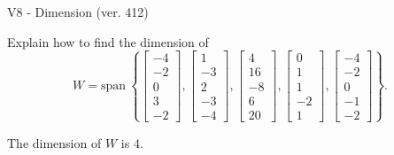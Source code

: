 \begin{exercise}
  \begin{exerciseTitle}V8 - Dimension (ver. 412)\end{exerciseTitle}
  \begin{exerciseStatement}
    Explain how to find the dimension of 
\[W=\mathrm{span}\ \left\{\left[\begin{array}{r}
-4 \\
-2 \\
0 \\
3 \\
-2
\end{array}\right] , \left[\begin{array}{r}
1 \\
-3 \\
2 \\
-3 \\
-4
\end{array}\right] , \left[\begin{array}{r}
4 \\
16 \\
-8 \\
6 \\
20
\end{array}\right] , \left[\begin{array}{r}
0 \\
1 \\
1 \\
-2 \\
1
\end{array}\right] , \left[\begin{array}{r}
-4 \\
-2 \\
0 \\
-1 \\
-2
\end{array}\right]\right\}.\]



  \end{exerciseStatement}
  \begin{exerciseAnswer}
   The dimension of \(W\) is  \(4\).
  


  \end{exerciseAnswer}
\end{exercise}